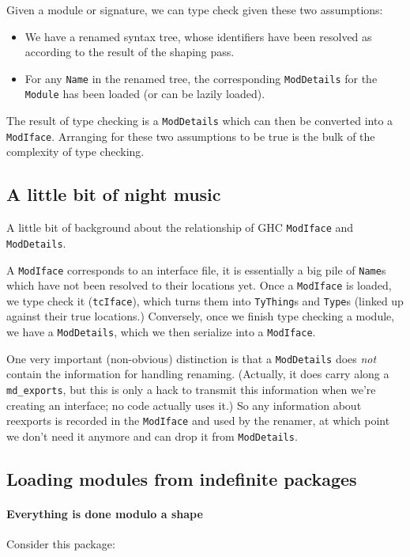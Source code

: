 \documentclass{article}
\begin{document}
Given a module or signature, we can type check given these two assumptions:

\begin{itemize}
    \item We have a renamed syntax tree, whose identifiers have been
          resolved as according to the result of the shaping pass.
    \item For any \verb|Name| in the renamed tree, the corresponding
          \verb|ModDetails| for the \verb|Module| has been loaded
          (or can be lazily loaded).
\end{itemize}

The result of type checking is a \verb|ModDetails| which can then be
converted into a \verb|ModIface|.
Arranging for these two assumptions to be true is the bulk of the
complexity of type checking.

\subsection{A little bit of night music}

A little bit of background about the relationship of GHC \verb|ModIface| and
\verb|ModDetails|.

A \verb|ModIface| corresponds to an interface file, it is essentially a
big pile of \verb|Name|s which have not been resolved to their locations
yet.  Once a \verb|ModIface| is loaded, we type check it
(\verb|tcIface|), which turns them into \verb|TyThing|s and \verb|Type|s
(linked up against their true locations.) Conversely, once we finish
type checking a module, we have a \verb|ModDetails|, which we then
serialize into a \verb|ModIface|.

One very important (non-obvious) distinction is that a \verb|ModDetails|
does \emph{not} contain the information for handling renaming.
(Actually, it does carry along a \verb|md_exports|, but this is only a
hack to transmit this information when we're creating an interface;
no code actually uses it.)  So any information about reexports is
recorded in the \verb|ModIface| and used by the renamer, at which point
we don't need it anymore and can drop it from \verb|ModDetails|.

\subsection{Loading modules from indefinite packages}

\paragraph{Everything is done modulo a shape}  Consider
this package:
\end{document}
